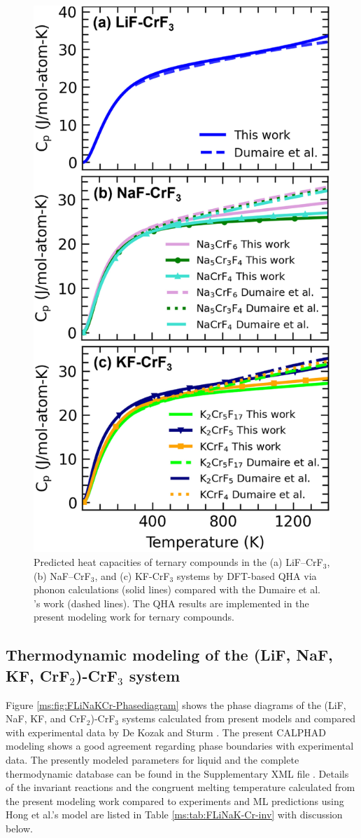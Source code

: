 \begin{figure}[H]
    \centering
    \includegraphics[width=0.45\linewidth]{moltensalts/Moltensalts-FLiNaKCr-DFTcompounds.jpg}
    \caption{Predicted heat capacities of ternary compounds in the (a) LiF–CrF$_3$, (b) NaF–CrF$_3$, and (c) KF-CrF$_3$ systems by DFT-based QHA via phonon calculations (solid lines) compared with the Dumaire et al. \cite{dumaire2021thermodynamic}'s work (dashed lines). The QHA results are implemented in the present modeling work for ternary compounds.}
    \label{ms:fig:FLiNaKCr-DFTcompounds}
\end{figure}



\subsection{Thermodynamic modeling of the (LiF, NaF, KF, CrF$_2$)-CrF$_3$ system} \label{moltensalts:ssec:FLiNaKCrmodeling}

Figure \ref{ms:fig:FLiNaKCr-Phasediagram} shows the phase diagrams of the (LiF, NaF, KF, and CrF$_2$)-CrF$_3$ systems calculated from present models and compared with experimental data by De Kozak \cite{de1975systeme, DeKozak1969} and Sturm \cite{sturm1962phase}. The present CALPHAD modeling shows a good agreement regarding phase boundaries with experimental data. The presently modeled parameters for liquid and the complete thermodynamic database can be found in the Supplementary XML file \cite{gong2024revisiting}. Details of the invariant reactions and the congruent melting temperature calculated from the present modeling work compared to experiments \cite{de1975systeme, DeKozak1969, sturm1962phase} and ML predictions using Hong et al.’s model \cite{hong2022melting} are listed in Table \ref{ms:tab:FLiNaK-Cr-inv} with discussion below. 

